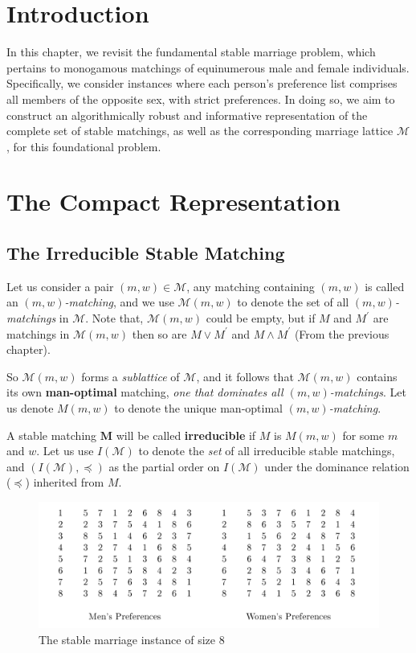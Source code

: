 \section{Introduction}
In this chapter, we revisit the fundamental stable marriage problem, which pertains to monogamous matchings of equinumerous male and female individuals. Specifically, we consider instances where each person's preference list comprises all members of the opposite sex, with strict preferences. In doing so, we aim to construct an algorithmically robust and informative representation of the complete set of stable matchings, as well as the corresponding marriage lattice $\mathcal{M}$, for this foundational problem.

\section{The Compact Representation}
\subsection{The Irreducible Stable Matching}
Let us consider a pair $(m, w) \in \mathcal{M}$, any matching containing $(m, w)$ is called an $(m,w)$\textit{-matching}, and we use $\mathcal{M}(m, w)$ to denote the set of all $(m, w)$\textit{-matchings} in $\mathcal{M}$. Note that, $\mathcal{M}(m, w)$ could be empty, but if $M$ and $M^\prime$ are matchings in $\mathcal{M}(m, w)$ then so are $M \vee M^\prime$ and $M \wedge M^\prime$ (From the previous chapter).

So $\mathcal{M}(m, w)$ forms a \textit{sublattice} of $\mathcal{M}$, and it follows that $\mathcal{M}(m, w)$ contains its own \textbf{man-optimal} matching, \textit{one that dominates all $(m, w)$-matchings}. Let us denote $M(m, w)$ to denote the unique man-optimal $(m, w)$\textit{-matching}.

A stable matching $\mathbf{M}$ will be called \textbf{irreducible} if $M$ is $M(m, w)$ for some $m$ and $w$. Let us use $I(\mathcal{M})$ to denote the \textit{set} of all irreducible stable matchings, and $(I(\mathcal{M}), \preceq)$ as the partial order on $I(\mathcal{M})$ under the dominance relation ($\preceq$) inherited from $M$.

\begin{figure}[ht]
  \centering
  \includegraphics[width=1\textwidth]{IMAGES_FIGS/FIG_2_0.png}
  \caption{The stable marriage instance of size 8}
  \label{FIG_2_1}
\end{figure}

